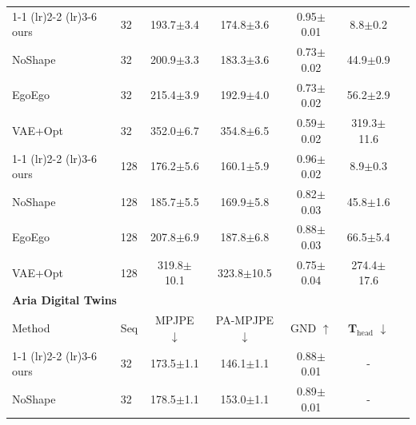 \begin{table}[t]
\begin{center}
{\begin{tabular}{llccccc}
\cmidrule(lr){1-1} \cmidrule(lr){2-2} \cmidrule(lr){3-6}
ours & 32 & \cellcolor{yellow!30}193.7\scriptsize{$\pm$3.4} & \cellcolor{yellow!30}174.8\scriptsize{$\pm$3.6} & \cellcolor{yellow!30}0.95\scriptsize{$\pm$0.01} & \cellcolor{yellow!30}8.8\scriptsize{$\pm$0.2}\\
NoShape & 32 & \cellcolor{orange!30}200.9\scriptsize{$\pm$3.3} & \cellcolor{orange!30}183.3\scriptsize{$\pm$3.6} & \cellcolor{orange!30}0.73\scriptsize{$\pm$0.02} & \cellcolor{orange!30}44.9\scriptsize{$\pm$0.9}\\
EgoEgo & 32 & \cellcolor{red!30}215.4\scriptsize{$\pm$3.9} & \cellcolor{red!30}192.9\scriptsize{$\pm$4.0} & \cellcolor{red!30}0.73\scriptsize{$\pm$0.02} & \cellcolor{red!30}56.2\scriptsize{$\pm$2.9}\\
VAE+Opt & 32 & 352.0\scriptsize{$\pm$6.7} & 354.8\scriptsize{$\pm$6.5} & 0.59\scriptsize{$\pm$0.02} & 319.3\scriptsize{$\pm$11.6}\\
\cmidrule(lr){1-1} \cmidrule(lr){2-2} \cmidrule(lr){3-6}
ours & 128 & \cellcolor{yellow!30}176.2\scriptsize{$\pm$5.6} & \cellcolor{yellow!30}160.1\scriptsize{$\pm$5.9} & \cellcolor{yellow!30}0.96\scriptsize{$\pm$0.02} & \cellcolor{yellow!30}8.9\scriptsize{$\pm$0.3}\\
NoShape & 128 & \cellcolor{orange!30}185.7\scriptsize{$\pm$5.5} & \cellcolor{orange!30}169.9\scriptsize{$\pm$5.8} & \cellcolor{red!30}0.82\scriptsize{$\pm$0.03} & \cellcolor{orange!30}45.8\scriptsize{$\pm$1.6}\\
EgoEgo & 128 & \cellcolor{red!30}207.8\scriptsize{$\pm$6.9} & \cellcolor{red!30}187.8\scriptsize{$\pm$6.8} & \cellcolor{orange!30}0.88\scriptsize{$\pm$0.03} & \cellcolor{red!30}66.5\scriptsize{$\pm$5.4}\\
VAE+Opt & 128 & 319.8\scriptsize{$\pm$10.1} & 323.8\scriptsize{$\pm$10.5} & 0.75\scriptsize{$\pm$0.04} & 274.4\scriptsize{$\pm$17.6}\\
\midrule
\multicolumn{4}{l}{\textbf{Aria Digital Twins~\cite{pan2023aria}}}\\
\midrule
Method & Seq & MPJPE $\downarrow$ & PA-MPJPE $\downarrow$ & GND $\uparrow$ & $\mathbf{T}_\text{head}$ $\downarrow$ \\
\cmidrule(lr){1-1} \cmidrule(lr){2-2} \cmidrule(lr){3-6}
ours & 32 & \cellcolor{yellow!30}173.5\scriptsize{$\pm$1.1} & \cellcolor{yellow!30}146.1\scriptsize{$\pm$1.1} & \cellcolor{orange!30}0.88\scriptsize{$\pm$0.01} & -\\
NoShape & 32 & \cellcolor{orange!30}178.5\scriptsize{$\pm$1.1} & \cellcolor{orange!30}153.0\scriptsize{$\pm$1.1} & \cellcolor{yellow!30}0.89\scriptsize{$\pm$0.01} & -\\

\end{tabular}}
\end{center}
\end{table}
